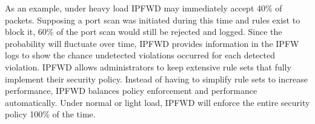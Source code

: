 \documentclass[fleqn]{article}%
\begin{document}
As an example, under heavy load IPFWD may immediately accept 40\% of packets.
Supposing a port scan was initiated during this time and rules exist to block
it, 60\% of the port scan would still be rejected and logged. Since the
probability will fluctuate over time, IPFWD provides information in the IPFW
logs to show the chance undetected violations occurred for each detected
violation. IPFWD allows administrators to keep extensive rule sets that fully
implement their security policy. Instead of having to simplify rule sets to
increase performance, IPFWD balances policy enforcement and performance
automatically. Under normal or light load, IPFWD will enforce the entire
security policy 100\% of the time. 
\end{document}
